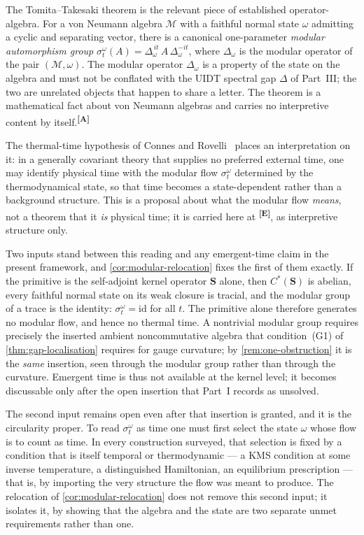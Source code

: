 \documentclass[12pt,a4paper,twoside]{article}
\theoremstyle{plain}
\theoremstyle{definition}
\theoremstyle{remark}
\newcommand{\catmark}[1]{\textsuperscript{\textsf{\textbf{[#1]}}}}
\begin{document}
The Tomita--Takesaki theorem is the relevant piece of established
operator-algebra. For a von Neumann algebra $\mathcal M$ with a faithful
normal state $\omega$ admitting a cyclic and separating vector, there is a
canonical one-parameter \emph{modular automorphism group}
$\sigma^{\omega}_t(A) = \Delta_\omega^{\,it}\, A\, \Delta_\omega^{-it}$,
where $\Delta_\omega$ is the modular operator of the pair
$(\mathcal M, \omega)$. The modular operator $\Delta_\omega$ is a property
of the state on the algebra and must not be conflated with the UIDT
spectral gap $\Delta$ of Part~III; the two are unrelated objects that
happen to share a letter. The theorem is a mathematical fact about von
Neumann algebras and carries no interpretive content by
itself.\catmark{A}

The thermal-time hypothesis of Connes and
Rovelli~\cite{connesrovelli1994} places an interpretation on it: in a
generally covariant theory that supplies no preferred external time, one
may identify physical time with the modular flow $\sigma^{\omega}_t$
determined by the thermodynamical state, so that time becomes a
state-dependent rather than a background structure. This is a proposal
about what the modular flow \emph{means}, not a theorem that it \emph{is}
physical time; it is carried here at \catmark{E}, as interpretive structure
only.

Two inputs stand between this reading and any emergent-time claim in the
present framework, and \cref{cor:modular-relocation} fixes the first of
them exactly. If the primitive is the self-adjoint kernel operator
$\mathbf S$ alone, then $C^{\ast}(\mathbf S)$ is abelian, every faithful
normal state on its weak closure is tracial, and the modular group of a
trace is the identity: $\sigma^{\omega}_t = \mathrm{id}$ for all $t$. The
primitive alone therefore generates no modular flow, and hence no thermal
time. A nontrivial modular group requires precisely the inserted ambient
noncommutative algebra that condition~(G1) of \cref{thm:gap-localisation}
requires for gauge curvature; by \cref{rem:one-obstruction} it is the
\emph{same} insertion, seen through the modular group rather than through
the curvature. Emergent time is thus not available at the kernel level; it
becomes discussable only after the open insertion that Part~I records as
unsolved.

The second input remains open even after that insertion is granted, and it
is the circularity proper. To read $\sigma^{\omega}_t$ as time one must
first select the state $\omega$ whose flow is to count as time. In every
construction surveyed, that selection is fixed by a condition that is
itself temporal or thermodynamic --- a KMS condition at some inverse
temperature, a distinguished Hamiltonian, an equilibrium prescription ---
that is, by importing the very structure the flow was meant to produce. The
relocation of \cref{cor:modular-relocation} does not remove this second
input; it isolates it, by showing that the algebra and the state are two
separate unmet requirements rather than one.
\end{document}
